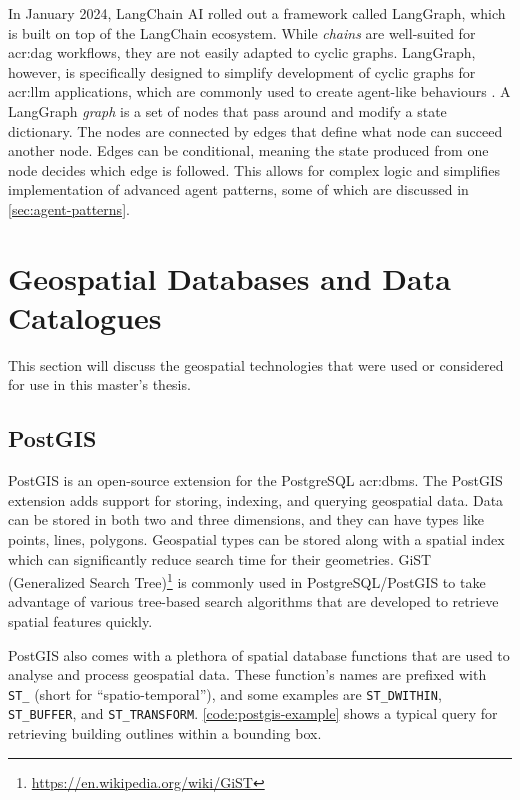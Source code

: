 In January 2024, LangChain AI rolled out a framework called LangGraph, which is built on top of the LangChain ecosystem. While \textit{chains} are well-suited for \gls{acr:dag} workflows, they are not easily adapted to cyclic graphs. LangGraph, however, is specifically designed to simplify development of cyclic graphs for \acrshort{acr:llm} applications, which are commonly used to create agent-like behaviours \citep{langchainaiLangchainaiLanggraph2024}. A LangGraph \textit{graph} is a set of nodes that pass around and modify a state dictionary. The nodes are connected by edges that define what node can succeed another node. Edges can be conditional, meaning the state produced from one node decides which edge is followed. This allows for complex logic and simplifies implementation of advanced agent patterns, some of which are discussed in \autoref{sec:agent-patterns}.


\section{Geospatial Databases and Data Catalogues}
\label{sec:geo-dbs-and-data-catalogues}

This section will discuss the geospatial technologies that were used or considered for use in this master's thesis.

\subsection{PostGIS}
\label{subsec:postgis}

PostGIS \citep{PostGIS2001} is an open-source extension for the PostgreSQL \acrshort{acr:dbms}. The PostGIS extension adds support for storing, indexing, and querying geospatial data. Data can be stored in both two and three dimensions, and they can have types like points, lines, polygons. Geospatial types can be stored along with a spatial index which can significantly reduce search time for their geometries. GiST (Generalized Search Tree)\footnote{\url{https://en.wikipedia.org/wiki/GiST}} is commonly used in PostgreSQL/PostGIS to take advantage of various tree-based search algorithms that are developed to retrieve spatial features quickly.

PostGIS also comes with a plethora of spatial database functions that are used to analyse and process geospatial data. These function's names are prefixed with \texttt{ST\_} (short for \enquote{spatio-temporal}), and some examples are \texttt{ST\_DWITHIN}, \texttt{ST\_BUFFER}, and \texttt{ST\_TRANSFORM}. \autoref{code:postgis-example} shows a typical query for retrieving building outlines within a bounding box.

